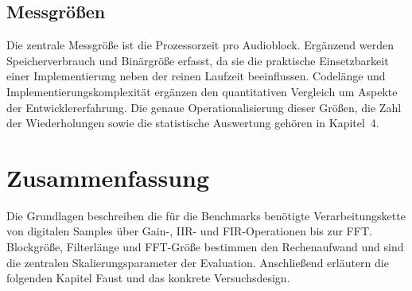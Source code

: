 \subsection{Messgrößen}
Die zentrale Messgröße ist die Prozessorzeit pro Audioblock. Ergänzend werden Speicherverbrauch und Binärgröße erfasst, da sie die praktische Einsetzbarkeit einer Implementierung neben der reinen Laufzeit beeinflussen. Codelänge und Implementierungskomplexität ergänzen den quantitativen Vergleich um Aspekte der Entwicklererfahrung. Die genaue Operationalisierung dieser Größen, die Zahl der Wiederholungen sowie die statistische Auswertung gehören in Kapitel~4.
\section{Zusammenfassung}
Die Grundlagen beschreiben die für die Benchmarks benötigte Verarbeitungskette von digitalen Samples über Gain-, IIR- und FIR-Operationen bis zur FFT. Blockgröße, Filterlänge und FFT-Größe bestimmen den Rechenaufwand und sind die zentralen Skalierungsparameter der Evaluation. Anschließend erläutern die folgenden Kapitel Faust und das konkrete Versuchsdesign.
